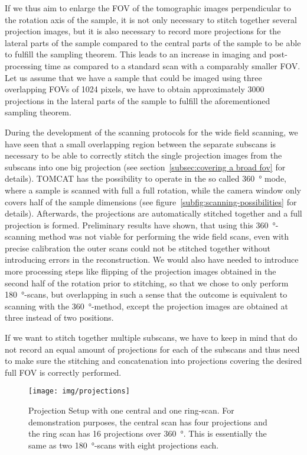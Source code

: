 If we thus aim to enlarge the FOV of the tomographic images perpendicular to the rotation axis of the sample, it is not only necessary to stitch together several projection images, but it is also necessary to record more projections for the lateral parts of the sample compared to the central parts of the sample to be able to fulfill the sampling theorem. This leads to an increase in imaging and post-processing time as compared to a standard scan with a comparably smaller FOV. Let us assume that we have a sample that could be imaged using three overlapping FOVs of 1024 pixels, we have to obtain approximately 3000 projections in the lateral parts of the sample to fulfill the aforementioned sampling theorem.

During the development of the scanning protocols for the wide field scanning, we have seen that a small overlapping region between the separate subscans is necessary to be able to correctly stitch the single projection images from the subscans into one big projection (see section~\ref{subsec:covering a broad fov} for details). TOMCAT has the possibility to operate in the so called \SI{360}{\degree} mode, where a sample is scanned with full a full rotation, while the camera window only covers half of the sample dimensions (see figure~\ref{subfig:scanning-possibilities} for details). Afterwards, the projections are automatically stitched together and a full projection is formed. Preliminary results have shown, that using this \SI{360}{\degree}-scanning method was not viable for performing the wide field scans, even with precise calibration the outer scans could not be stitched together without introducing errors in the reconstruction. We would also have needed to introduce more processing steps like flipping of the projection images obtained in the second half of the rotation prior to stitching, so that we chose to only perform \SI{180}{\degree}-scans, but overlapping in such a sense that the outcome is equivalent to scanning with the \SI{360}{\degree}-method, except the projection images are obtained at three instead of two positions.

If we want to stitch together multiple subscans,  we have to keep in mind that do not record an equal amount of projections for each of the subscans and thus need to make sure the stitching and concatenation into projections covering the desired full FOV is correctly performed.

\begin{figure*}
	\centering
		\texttt{[image: img/projections]}
	\caption{Projection Setup with one central and one ring-scan. For demonstration purposes, the central scan has four projections and the ring scan has 16 projections over \SI{360}{\degree}. This is essentially the same as two \SI{180}{\degree}-scans with eight projections each.}
	\label{fig:projections}
\end{figure*}
